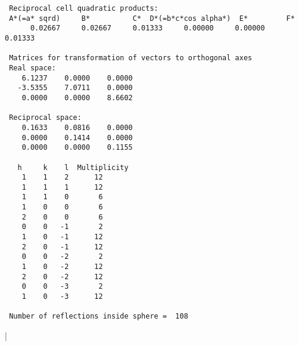 {\begin{verbatim}
 Reciprocal cell quadratic products:
 A*(=a* sqrd)     B*          C*  D*(=b*c*cos alpha*)  E*         F*
      0.02667     0.02667     0.01333     0.00000     0.00000     0.01333

 Matrices for transformation of vectors to orthogonal axes
 Real space:
    6.1237    0.0000    0.0000
   -3.5355    7.0711    0.0000
    0.0000    0.0000    8.6602

 Reciprocal space:
    0.1633    0.0816    0.0000
    0.0000    0.1414    0.0000
    0.0000    0.0000    0.1155

   h     k    l  Multiplicity
    1    1    2      12
    1    1    1      12
    1    1    0       6
    1    0    0       6
    2    0    0       6
    0    0   -1       2
    1    0   -1      12
    2    0   -1      12
    0    0   -2       2
    1    0   -2      12
    2    0   -2      12
    0    0   -3       2
    1    0   -3      12

 Number of reflections inside sphere =  108
\end{verbatim}|
\par  
\goodbreak
}
